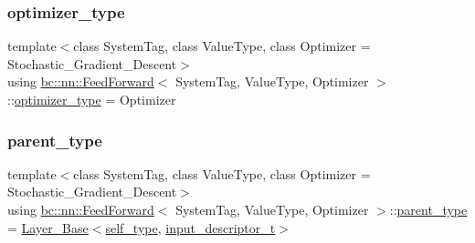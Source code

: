 \mbox{\label{structbc_1_1nn_1_1FeedForward_a133dfeb1b5d39d9226c1a45489d71e17}} 
\subsubsection{\texorpdfstring{optimizer\+\_\+type}{optimizer\_type}}
{\footnotesize\ttfamily template$<$class System\+Tag, class Value\+Type, class Optimizer = Stochastic\+\_\+\+Gradient\+\_\+\+Descent$>$ \\
using \hyperlink{structbc_1_1nn_1_1FeedForward}{bc\+::nn\+::\+Feed\+Forward}$<$ System\+Tag, Value\+Type, Optimizer $>$\+::\hyperlink{structbc_1_1nn_1_1FeedForward_a133dfeb1b5d39d9226c1a45489d71e17}{optimizer\+\_\+type} =  Optimizer}

\mbox{\label{structbc_1_1nn_1_1FeedForward_add1247c27cdb81aaec0082593d27250d}} 
\subsubsection{\texorpdfstring{parent\+\_\+type}{parent\_type}}
{\footnotesize\ttfamily template$<$class System\+Tag, class Value\+Type, class Optimizer = Stochastic\+\_\+\+Gradient\+\_\+\+Descent$>$ \\
using \hyperlink{structbc_1_1nn_1_1FeedForward}{bc\+::nn\+::\+Feed\+Forward}$<$ System\+Tag, Value\+Type, Optimizer $>$\+::\hyperlink{structbc_1_1nn_1_1FeedForward_add1247c27cdb81aaec0082593d27250d}{parent\+\_\+type} =  \hyperlink{structbc_1_1nn_1_1Layer__Base}{Layer\+\_\+\+Base}$<$\hyperlink{structbc_1_1nn_1_1FeedForward_aed5e64ba066faee4ed589d71a5d8dd56}{self\+\_\+type}, \hyperlink{structbc_1_1nn_1_1FeedForward_ab2b920592729859e37b474e4b0356c63}{input\+\_\+descriptor\+\_\+t}$>$}

\mbox{\label{structbc_1_1nn_1_1FeedForward_aed5e64ba066faee4ed589d71a5d8dd56}} 
